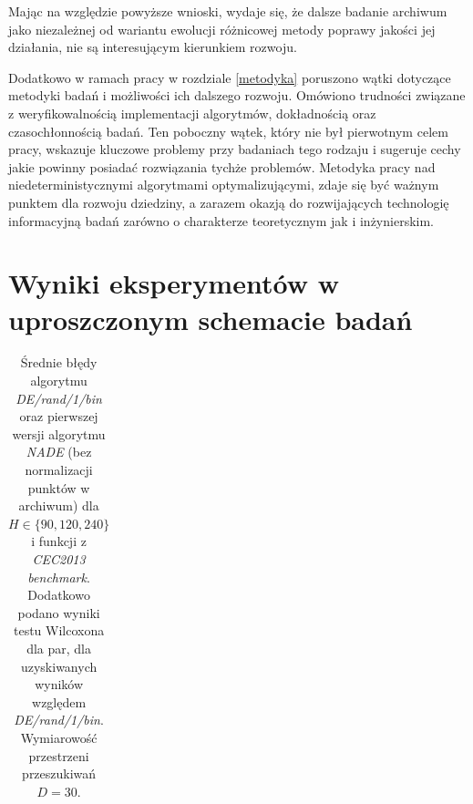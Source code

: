 \documentclass[12pt,a4paper]{report}
\begin{document}
{{{{{{{{}
\par{
Mając na względzie powyższe wnioski, wydaje się, że dalsze badanie archiwum jako niezależnej od wariantu ewolucji różnicowej metody poprawy jakości jej działania, nie są interesującym kierunkiem rozwoju.
}
\par{
Dodatkowo w ramach pracy w rozdziale \ref{metodyka} poruszono wątki dotyczące metodyki badań i możliwości ich dalszego rozwoju. Omówiono trudności związane z weryfikowalnością implementacji algorytmów, dokładnością oraz czasochłonnością badań. Ten poboczny wątek, który nie był pierwotnym celem pracy, wskazuje kluczowe problemy przy badaniach tego rodzaju i sugeruje cechy jakie powinny posiadać rozwiązania tychże problemów. Metodyka pracy nad niedeterministycznymi algorytmami optymalizującymi, zdaje się być ważnym punktem dla rozwoju dziedziny, a zarazem okazją do rozwijających technologię informacyjną badań zarówno o charakterze teoretycznym jak i inżynierskim.
}
\appendix
\chapter{Wyniki eksperymentów w uproszczonym schemacie badań}
\label{ResultsAttachments}
\begin{table}[h]
\centering
\caption{
Średnie błędy algorytmu \emph{DE/rand/1/bin} oraz pierwszej wersji algorytmu \emph{NADE} (bez normalizacji punktów w archiwum) dla $H \in \{90, 120, 240\}$ i funkcji z \emph{CEC2013 benchmark}. Dodatkowo podano wyniki testu Wilcoxona dla par, dla uzyskiwanych wyników względem \emph{DE/rand/1/bin}. Wymiarowość przestrzeni przeszukiwań $D = 30$.
}
\par{\vphantom{10}}
\par{ }
\label{Eksp1}
\begin{tabular}{|l|l|l|l|l|}


\end{tabular}
\end{table}}}}}}}}
\end{document}
